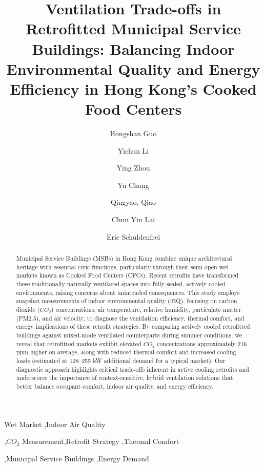 \documentclass[preprint,12pt]{elsarticle}
\begin{document}
\begin{frontmatter}




\title{Ventilation Trade-offs in Retrofitted Municipal Service Buildings: Balancing Indoor Environmental Quality and Energy Efficiency in Hong Kong’s Cooked Food Centers}




\author[inst1]{Hongshan Guo}
\author[inst1]{Yichun Li}
\author[inst1]{Ying Zhou}
\author[inst1]{Yu Chang}
\author[inst1]{Qingyao, Qiao}
\author[inst2]{Chun Yin Lai}
\author[inst1]{Eric Schuldenfrei}





\begin{abstract}



Municipal Service Buildings (MSBs) in Hong Kong combine unique architectural heritage with essential civic functions, particularly through their semi-open wet markets known as Cooked Food Centers (CFCs). Recent retrofits have transformed these traditionally naturally ventilated spaces into fully sealed, actively cooled environments, raising concerns about unintended consequences. This study employs snapshot measurements of indoor environmental quality (iEQ), focusing on carbon dioxide ($CO_2$) concentrations, air temperature, relative humidity, particulate matter (PM2.5), and air velocity, to diagnose the ventilation efficiency, thermal comfort, and energy implications of these retrofit strategies. By comparing actively cooled retrofitted buildings against mixed-mode ventilated counterparts during summer conditions, we reveal that retrofitted markets exhibit elevated $CO_2$ concentrations approximately 216 ppm higher on average, along with reduced thermal comfort and increased cooling loads (estimated at 128–255 kW additional demand for a typical market). Our diagnostic approach highlights critical trade-offs inherent in active cooling retrofits and underscores the importance of context-sensitive, hybrid ventilation solutions that better balance occupant comfort, indoor air quality, and energy efficiency.


\end{abstract}



\begin{keyword}

Wet Market \sep Indoor Air Quality

\sep$CO_2$ Measurement\sep Retrofit Strategy \sep Thermal Comfort

\sep Municipal Service Buildings \sep Energy Demand
\end{keyword}
\end{frontmatter}
\end{document}
